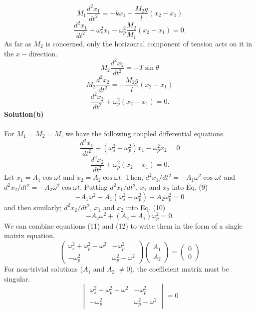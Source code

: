 \documentclass[12pt,a4paper]{article}
\begin{document}
\[M_1\frac{d^2x_1}{dt^2}=-kx_1+\frac{M_2g}{l}(x_2-x_1)\]
\begin{equation}
    \frac{d^2x_1}{dt^2}+\omega_s^2x_1-\omega_p^2\frac{M_2}{M_1}(x_2-x_1)=0.
\end{equation}
As far as $M_2$ is concerned, only the horizontal component of tension acts on it in the $x-$direction.
\[M_2\frac{d^2x_2}{dt^2}=-T\sin\theta\]
\[M_2\frac{d^2x_2}{dt^2}=-\frac{M_2g}{l}(x_2-x_1)\]
\begin{equation}
    \frac{d^2x_2}{dt^2}+\omega_p^2(x_2-x_1)=0.
\end{equation}
\textbf{Solution(b)}
\\
\\For $M_1=M_2=M$, we have the following coupled differential equations
\begin{equation}
   \frac{d^2x_1}{dt^2}+\left(\omega_s^2+\omega_p^2\right)x_1-\omega_p^2x_2=0 
\end{equation}
\begin{equation}
    \frac{d^2x_2}{dt^2}+\omega_p^2(x_2-x_1)=0.
\end{equation}
\newpage
Let $x_1=A_1\cos\omega t$ and $x_2=A_2\cos\omega t$. Then, $d^2x_1/dt^2=-A_1\omega^2\cos\omega t$ and $d^2x_2/dt^2=-A_2\omega^2\cos\omega t$. Putting $d^2x_1/dt^2$, $x_1$ and $x_2$ into Eq. (9)
\begin{equation}
    -A_1\omega^2+A_1(\omega_s^2+\omega_p^2)-A_2\omega_p^2=0
\end{equation}
and then similarly; $d^2x_2/dt^2$, $x_1$ and $x_2$ into Eq. (10)
\begin{equation}
    -A_2\omega^2+(A_2-A_1)\omega_p^2=0.
\end{equation}
We can combine equations (11) and (12) to write them in the form of a single matrix equation.
\begin{equation}
    \begin{pmatrix}
    \omega_s^2+\omega_p^2-\omega^2 & -\omega_p^2\\
    -\omega_p^2 & \omega_p^2-\omega^2
\end{pmatrix}
\begin{pmatrix}
    A_1\\
    A_2
\end{pmatrix}=
\begin{pmatrix}
    0\\
    0
\end{pmatrix}
\end{equation}
For non-trivial solutions ($A_1$ and $A_2$ $\neq0$), the coefficient matrix must be singular.
\[\begin{vmatrix}
    \omega_s^2+\omega_p^2-\omega^2 & -\omega_p^2\\
    -\omega_p^2 & \omega_p^2-\omega^2
\end{vmatrix}=0\]
\end{document}
